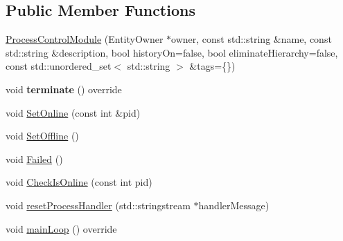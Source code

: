 \subsection*{Public Member Functions}
\begin{DoxyCompactItemize}
\item 
\hyperlink{structProcessControlModule_aeb13fc3f3ac0d0c4d735dc649cf48ce4}{Process\+Control\+Module} (Entity\+Owner $\ast$owner, const std\+::string \&name, const std\+::string \&description, bool history\+On=false, bool eliminate\+Hierarchy=false, const std\+::unordered\+\_\+set$<$ std\+::string $>$ \&tags=\{\})
\item 
void {\bfseries terminate} () override\hypertarget{structProcessControlModule_aa99b03cec10164e4206cc1fe16ac125f}{}\label{structProcessControlModule_aa99b03cec10164e4206cc1fe16ac125f}

\item 
void \hyperlink{structProcessControlModule_a024e9400a25c321f0adec1b56f1ec4b9}{Set\+Online} (const int \&pid)
\item 
void \hyperlink{structProcessControlModule_ac3e106db5a3547a55389ddc35e7df675}{Set\+Offline} ()
\item 
void \hyperlink{structProcessControlModule_a386c9f77a4da6cd95b5ffb0007f3c27d}{Failed} ()
\item 
void \hyperlink{structProcessControlModule_a4df7e3fdb51ab49df9867ac9b8a7d29b}{Check\+Is\+Online} (const int pid)
\item 
void \hyperlink{structProcessControlModule_ad6b88baf5da957ca448220eab1b29f5c}{reset\+Process\+Handler} (std\+::stringstream $\ast$handler\+Message)
\item 
void \hyperlink{structProcessControlModule_ac3024292ea7763b6bc2b15a710f0f5ed}{main\+Loop} () override
\end{DoxyCompactItemize}
